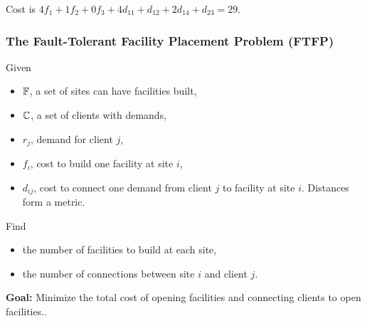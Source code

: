 \documentclass[handout, hyperref, xcolor=dvipsnames]{beamer}
\begin{document}
\begin{frame}
\begin{minipage}{.4\linewidth}
  \end{minipage}
  \vspace{.1in}

  Cost is $4f_1 + 1f_2 + 0f_3 + 4d_{11} + d_{12} + 2d_{14} +
  d_{23} = 29$.
\end{frame}
\begin{frame}
  \frametitle{The Fault-Tolerant Facility Placement Problem (FTFP)}
  Given
  \begin{itemize}
  \item $\mathbb{F}$, a set of sites can have facilities built,
  \item $\mathbb{C}$, a set of clients with demands,
  \item $r_j$, demand for client $j$,
  \item $f_i$, cost to build one facility at site $i$,
  \item $d_{ij}$, cost to connect one demand from client $j$ to
    facility at site $i$. Distances form a metric.
  \end{itemize}
  Find 
  \begin{itemize}
  \item the number of facilities to build at each site,
  \item the number of connections between site $i$ and client
    $j$.
  \end{itemize}

  \textbf{Goal:} Minimize the total cost of opening
  facilities and connecting clients to open facilities..
\end{frame}
\end{document}
